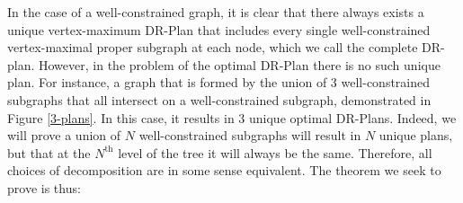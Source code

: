\begin{figure*}



\caption{A well-constrained graph whose nodes are subgraphs labeled with their density. Below are its 3 optimal DR-Plans (partially complete). The center vertex has weight $k$ and is well-constrained itself. The radial nodes have weights $x,y,z \neq k$ with equivalent edge weights, making any union between $k$ and the others well-constrained. }
\label{3-plans}
\end{figure*}

In the case of a well-constrained graph, it is clear that there always exists a unique vertex-maximum DR-Plan that includes every single well-constrained vertex-maximal proper subgraph at each node, which we call the complete DR-plan. However, in the problem of the optimal DR-Plan there is no such unique plan. For instance, a graph that is formed by the union of 3 well-constrained subgraphs that all intersect on a well-constrained subgraph, demonstrated in Figure \ref{3-plans}. In this case, it results in $3$ unique optimal DR-Plans. Indeed, we will prove a union of $N$ well-constrained subgraphs will result in $N$ unique plans, but that at the $N^{\text{th}}$ level of the tree it will always be the same. Therefore, all choices of decomposition are in some sense equivalent. The theorem we seek to prove is thus:


